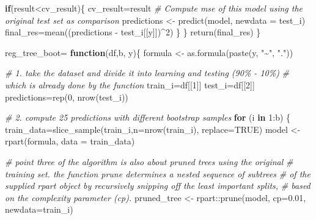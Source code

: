 \documentclass[
]{article}
\newenvironment{Shaded}{\begin{snugshade}}{\end{snugshade}}
\newcommand{\AttributeTok}[1]{\textcolor[rgb]{0.77,0.63,0.00}{#1}}
\newcommand{\CommentTok}[1]{\textcolor[rgb]{0.56,0.35,0.01}{\textit{#1}}}
\newcommand{\ConstantTok}[1]{\textcolor[rgb]{0.00,0.00,0.00}{#1}}
\newcommand{\ControlFlowTok}[1]{\textcolor[rgb]{0.13,0.29,0.53}{\textbf{#1}}}
\newcommand{\DecValTok}[1]{\textcolor[rgb]{0.00,0.00,0.81}{#1}}
\newcommand{\FloatTok}[1]{\textcolor[rgb]{0.00,0.00,0.81}{#1}}
\newcommand{\FunctionTok}[1]{\textcolor[rgb]{0.00,0.00,0.00}{#1}}
\newcommand{\NormalTok}[1]{#1}
\newcommand{\OtherTok}[1]{\textcolor[rgb]{0.56,0.35,0.01}{#1}}
\newcommand{\SpecialCharTok}[1]{\textcolor[rgb]{0.00,0.00,0.00}{#1}}
\newcommand{\StringTok}[1]{\textcolor[rgb]{0.31,0.60,0.02}{#1}}
\begin{document}
\begin{Shaded}
\begin{Highlighting}[]
  \ControlFlowTok{if}\NormalTok{(result}\SpecialCharTok{\textless{}}\NormalTok{cv\_result)\{}
\NormalTok{    cv\_result}\OtherTok{=}\NormalTok{result}
    \CommentTok{\# Compute mse of this model using the original test set as comparison}
\NormalTok{    predictions }\OtherTok{\textless{}{-}} \FunctionTok{predict}\NormalTok{(model, }\AttributeTok{newdata =}\NormalTok{ test\_i)}
\NormalTok{    final\_res}\OtherTok{=}\FunctionTok{mean}\NormalTok{((predictions }\SpecialCharTok{{-}}\NormalTok{ test\_i[[y]])}\SpecialCharTok{\^{}}\DecValTok{2}\NormalTok{)}
\NormalTok{  \}}
\NormalTok{  \}}
  \FunctionTok{return}\NormalTok{(final\_res)}
\NormalTok{\}}

\NormalTok{reg\_tree\_boot}\OtherTok{=} \ControlFlowTok{function}\NormalTok{(df,b, y)\{}
\NormalTok{  formula }\OtherTok{\textless{}{-}} \FunctionTok{as.formula}\NormalTok{(}\FunctionTok{paste}\NormalTok{(y, }\StringTok{"\textasciitilde{}"}\NormalTok{, }\StringTok{"."}\NormalTok{))}
  
  \CommentTok{\# 1. take the dataset and divide it into learning and testing (90\% {-} 10\%)}
  \CommentTok{\# which is already done by the function }
\NormalTok{  train\_i}\OtherTok{=}\NormalTok{df[[}\DecValTok{1}\NormalTok{]]}
\NormalTok{  test\_i}\OtherTok{=}\NormalTok{df[[}\DecValTok{2}\NormalTok{]]}
\NormalTok{  predictions}\OtherTok{=}\FunctionTok{rep}\NormalTok{(}\DecValTok{0}\NormalTok{, }\FunctionTok{nrow}\NormalTok{(test\_i))}
  
  \CommentTok{\# 2. compute 25 predictions with different bootstrap samples}
  \ControlFlowTok{for}\NormalTok{ (i }\ControlFlowTok{in} \DecValTok{1}\SpecialCharTok{:}\NormalTok{b) \{}
\NormalTok{  train\_data}\OtherTok{=}\FunctionTok{slice\_sample}\NormalTok{(train\_i,}\AttributeTok{n=}\FunctionTok{nrow}\NormalTok{(train\_i), }\AttributeTok{replace=}\ConstantTok{TRUE}\NormalTok{)}
\NormalTok{  model }\OtherTok{\textless{}{-}} \FunctionTok{rpart}\NormalTok{(formula, }\AttributeTok{data =}\NormalTok{ train\_data)}
  
  \CommentTok{\# point three of the algorithm is also about pruned trees using the original }
  \CommentTok{\# training set. the function prune determines a nested sequence of subtrees }
  \CommentTok{\# of the supplied rpart object by recursively snipping off the least important splits, }
  \CommentTok{\# based on the complexity parameter (cp).}
\NormalTok{  pruned\_tree }\OtherTok{\textless{}{-}}\NormalTok{ rpart}\SpecialCharTok{::}\FunctionTok{prune}\NormalTok{(model, }\AttributeTok{cp=}\FloatTok{0.01}\NormalTok{, }\AttributeTok{newdata=}\NormalTok{train\_i)}
  

\end{Highlighting}
\end{Shaded}
\end{document}
